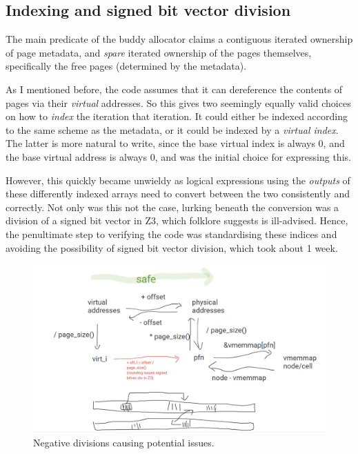 \subsection{Indexing and signed bit vector division}

The main predicate of the buddy allocator claims a contiguous iterated
ownership of page metadata, and \emph{spare} iterated ownership of the pages
themselves, specifically the free pages (determined by the metadata).

As I mentioned before, the code assumes that it can dereference the contents of
pages via their \emph{virtual} addresses. So this gives two seemingly equally
valid choices on how to \emph{index} the iteration that iteration. It could
either be indexed according to the same scheme as the metadata, or it could be
indexed by a \emph{virtual index}. The latter is more natural to write, since
the base virtual index is always 0, and the base virtual address is always 0,
and was the initial choice for expressing this.

However, this quickly became unwieldy as logical expressions using the
\emph{outputs} of these differently indexed arrays need to convert between the
two consistently and correctly. Not only was this not the case, lurking beneath
the conversion was a division of a signed bit vector in Z3, which
folklore suggests is
ill-advised. Hence, the penultimate step to verifying the code was
standardising these indices and avoiding the possibility of signed bit vector
division, which took about 1 week.

\begin{figure}[tp]
\includegraphics{figures/buddy-negative-div.png}
\caption{Negative divisions causing potential issues.}\label{fig:buddy-negative-div}
\end{figure}

